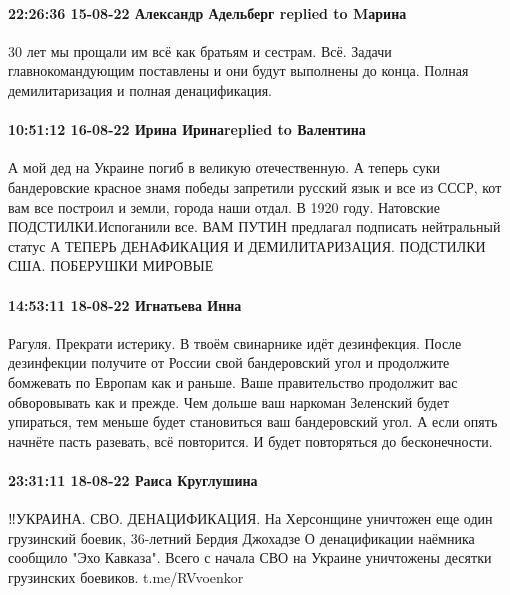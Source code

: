  
 
 
 
 

\paragraph{22:26:36 15-08-22 Александр Адельберг replied to Mарина}

30 лет мы прощали им всё как братьям и сестрам. Всё. Задачи главнокомандующим
поставлены и они будут выполнены до конца.
Полная демилитаризация и полная денацификация.

\paragraph{10:51:12 16-08-22 Ирина Иринаreplied to Валентина}

\obeycr
А мой дед на Украине погиб в великую отечественную.
А теперь суки бандеровские красное знамя победы запретили русский язык и все из СССР, кот вам все построил и земли, города наши отдал. В 1920 году.
Натовские ПОДСТИЛКИ.Испоганили все.
ВАМ ПУТИН предлагал подписать нейтральный статус
А ТЕПЕРЬ ДЕНАФИКАЦИЯ И ДЕМИЛИТАРИЗАЦИЯ.
ПОДСТИЛКИ США.
ПОБЕРУШКИ МИРОВЫЕ
\restorecr

\paragraph{14:53:11 18-08-22 Игнатьева Инна}

Рагуля. Прекрати истерику. В твоём свинарнике идёт дезинфекция.  После
дезинфекции получите от России свой бандеровский угол и продолжите бомжевать по
Европам как и раньше.  Ваше правительство продолжит вас обворовывать как и
прежде.  Чем дольше ваш наркоман Зеленский будет упираться, тем меньше будет
становиться ваш бандеровский угол.  А если опять начнёте пасть разевать, всё
повторится. И будет повторяться до бесконечности. 

\paragraph{23:31:11 18-08-22 Раиса Круглушина}

‼УКРАИНА. СВО. ДЕНАЦИФИКАЦИЯ. На Херсонщине уничтожен еще один грузинский боевик, 36-летний Бердия Джохадзе
О денацификации наёмника сообщило "Эхо Кавказа". Всего с начала СВО на Украине уничтожены десятки грузинских боевиков. t.me/RVvoenkor
